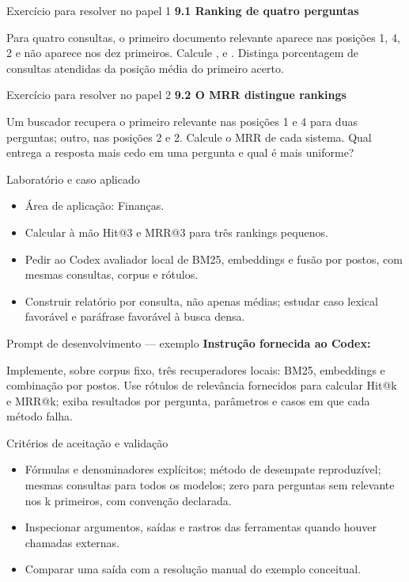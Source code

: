 \documentclass[10pt,aspectratio=169]{beamer}
\begin{document}
\begin{frame}[t]{Exercício para resolver no papel 1}
\small
\small\textbf{9.1 Ranking de quatro perguntas}\par\vspace{4mm}Para quatro consultas, o primeiro documento relevante aparece nas posições 1, 4, 2 e não aparece nos dez primeiros. Calcule , e . Distinga porcentagem de consultas atendidas da posição média do primeiro acerto.
\end{frame}

\begin{frame}[t]{Exercício para resolver no papel 2}
\small
\small\textbf{9.2 O MRR distingue rankings}\par\vspace{4mm}Um buscador recupera o primeiro relevante nas posições 1 e 4 para duas perguntas; outro, nas posições 2 e 2. Calcule o MRR de cada sistema. Qual entrega a resposta mais cedo em uma pergunta e qual é mais uniforme?
\end{frame}

\begin{frame}[t]{Laboratório e caso aplicado}
\small
\begin{itemize}
\item Área de aplicação: Finanças.
\item Calcular à mão Hit@3 e MRR@3 para três rankings pequenos.
\item Pedir ao Codex avaliador local de BM25, embeddings e fusão por postos, com mesmas consultas, corpus e rótulos.
\item Construir relatório por consulta, não apenas médias; estudar caso lexical favorável e paráfrase favorável à busca densa.
\end{itemize}
\end{frame}

\begin{frame}[t]{Prompt de desenvolvimento — exemplo}
\small
\small\textbf{Instrução fornecida ao Codex:}\par\vspace{5mm}Implemente, sobre corpus fixo, três recuperadores locais: BM25, embeddings e combinação por postos. Use rótulos de relevância fornecidos para calcular Hit@k e MRR@k; exiba resultados por pergunta, parâmetros e casos em que cada método falha.
\end{frame}

\begin{frame}[t]{Critérios de aceitação e validação}
\small
\begin{itemize}
\item Fórmulas e denominadores explícitos; método de desempate reproduzível; mesmas consultas para todos os modelos; zero para perguntas sem relevante nos k primeiros, com convenção declarada.
\item Inspecionar argumentos, saídas e rastros das ferramentas quando houver chamadas externas.
\item Comparar uma saída com a resolução manual do exemplo conceitual.
\end{itemize}
\end{frame}
\end{document}
